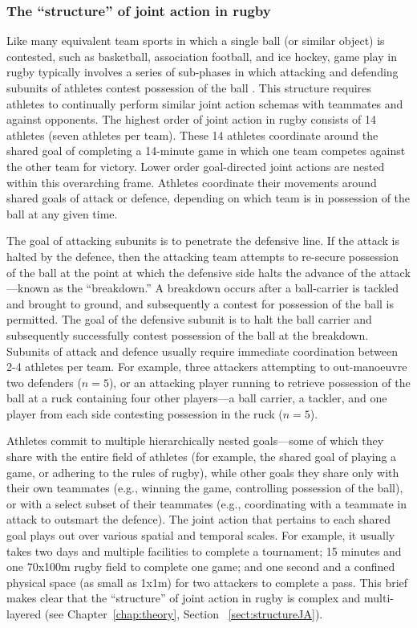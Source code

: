 \begin{CJK}{UTF8}{gbsn}
\subsubsection{The ``structure'' of joint action in rugby}
Like many equivalent team sports in which a single ball (or similar object) is contested, such as basketball, association football, and ice hockey, game play in rugby typically involves a series of sub-phases in which attacking and defending subunits of athletes contest possession of the ball \citep{Passos2011}.  This structure requires athletes to continually perform similar joint action schemas with teammates and against opponents.   The highest order of joint action in rugby consists of 14 athletes (seven athletes per team).  These 14 athletes coordinate around the shared goal of completing a 14-minute game in which one team competes against the other team for victory.  Lower order goal-directed joint actions are nested within this overarching frame.  Athletes coordinate their movements around shared goals of attack or defence, depending on which team is in possession of the ball at any given time.

The goal of attacking subunits is to penetrate the defensive line. If the attack is halted by the defence, then the attacking team attempts to re-secure possession of the ball at the point at which the defensive side halts the advance of the attack---known as the ``breakdown.''  A breakdown occurs after a ball-carrier is tackled and brought to ground, and subsequently a contest for possession of the ball is permitted.  The goal of the defensive subunit is to halt the ball carrier and subsequently successfully contest possession of the ball at the breakdown.  Subunits of attack and defence usually require immediate coordination between 2-4 athletes per team.  For example, three attackers attempting to out-manoeuvre two defenders ($n = 5$), or an attacking player running to retrieve possession of the ball at a ruck containing four other players---a ball carrier, a tackler, and one player from each side contesting possession in the ruck ($n = 5$).

Athletes commit to multiple hierarchically nested goals---some of which they share with the entire field of athletes (for example, the shared goal of playing a game, or adhering to the rules of rugby), while other goals they share only with their own teammates (e.g., winning the game, controlling possession of the ball), or with a select subset of their teammates (e.g., coordinating with a teammate in attack to outsmart the defence).  The joint action that pertains to each shared goal plays out over various spatial and temporal scales.  For example, it usually takes two days and multiple facilities to complete a tournament; 15 minutes and one 70x100m rugby field to complete one game; and one second and a confined physical space (as small as 1x1m) for two attackers to complete a pass.  This brief makes clear that the ``structure'' \citep[cf.][]{Keller2014} of joint action in rugby is complex and multi-layered (see Chapter~\ref{chap:theory}, Section ~\ref{sect:structureJA}).



\end{CJK}
